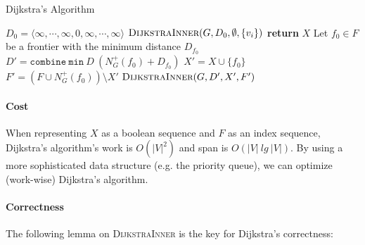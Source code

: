 \documentclass[11pt,a4paper,oneside,microtype,nokorean]{oblivoir}
\begin{document}
\begin{algorithm}
  \caption{Dijkstra's Algorithm}\label{dijkstra}
  \begin{algorithmic}[1]
     
    \State $D_0 = \langle \infty, \cdots, \infty, 0, \infty, \cdots, \infty \rangle$ 
    \State $\Call{DijkstraInner}{G,D_0,\emptyset,\{v_i\}}$
    \EndProcedure
    \Statex
     
    \State \textbf{return} $X$
    \EndIf
    \State Let $f_0 \in F$ be a frontier with the minimum distance $D_{f_0}$
    \State $D' = \texttt{combine}~\texttt{min}~D~(N^+_G(f_0) + D_{f_0})$ 
    \State $X' = X \cup \{f_0\}$
    \State $F' = (F \cup N^+_G(f_0)) \setminus X'$
    \State $\Call{DijkstraInner}{G,D',X',F'}$
    \EndProcedure
  \end{algorithmic}
\end{algorithm}


\paragraph{Cost}

When representing $X$ as a boolean sequence and $F$ as an index sequence, Dijkstra's algorithm's
work is $O(|V|^2)$ and span is $O(|V|~lg~|V|)$.  By using a more sophisticated data structure
(e.g. the priority queue), we can optimize (work-wise) Dijkstra's algorithm.



\paragraph{Correctness} The following lemma on \textsc{DijkstraInner} is the key for Dijkstra's
correctness:
\end{document}
